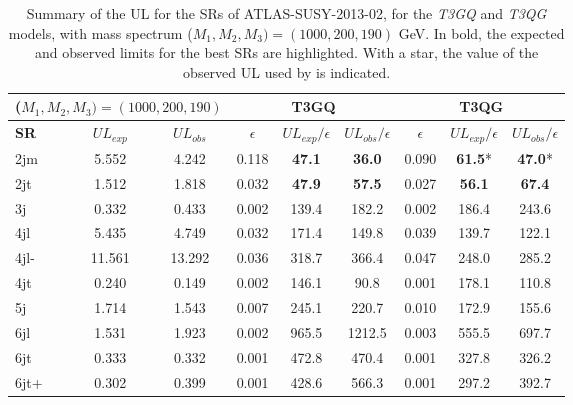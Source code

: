 \documentclass[epj,nopacs,fleqn]{svjour}
\begin{document}
\begin{table}[h]
\centering
\renewcommand\arraystretch{1.3} 
\scriptsize
\begin{tabular}{ l c c    c c c  |  c c c  }
\toprule \toprule
\multicolumn{3}{c}{($M_1,M_2,M_3) = (1000,200,190)$} & \multicolumn{3}{c}{ \textbf{T3GQ}} & \multicolumn{3}{c}{ \textbf{T3QG}} \\  \toprule 
\textbf{SR} & $UL_{exp}$ & $UL_{obs}$ & $\epsilon$ &  $UL_{exp}/\epsilon$ & $UL_{obs}/\epsilon$ & $\epsilon$ & $UL_{exp}/ \epsilon$ & $UL_{obs}/ \epsilon$ \\
2jm & 5.552 &  4.242 &  0.118  & \textbf{47.1} &  \textbf{36.0}  &  0.090 &  \textbf{61.5}*  & \textbf{47.0}*\\
2jt  & 1.512  & 1.818 &  0.032  & \textbf{47.9} &  \textbf{57.5}  &  0.027 &  \textbf{56.1}  & \textbf{67.4} \\
3j &  0.332 &  0.433  & 0.002 &  139.4 &  182.2  &  0.002 &  186.4 &  243.6 \\ 
4jl  & 5.435 &  4.749  & 0.032  & 171.4  & 149.8  &  0.039 &  139.7  & 122.1 \\
4jl-  & 11.561 &  13.292 &  0.036  & 318.7 &  366.4  &  0.047 &  248.0 &  285.2 \\
4jt  & 0.240  & 0.149  & 0.002  & 146.1  & 90.8 &   0.001  & 178.1  & 110.8 \\
5j  & 1.714  & 1.543  & 0.007 &  245.1 &  220.7  &  0.010  & 172.9  & 155.6 \\
6jl  & 1.531  & 1.923  & 0.002  & 965.5 &  1212.5  & 0.003  & 555.5 &  697.7 \\
6jt &  0.333  & 0.332 &  0.001  & 472.8  & 470.4 &  0.001 &  327.8  & 326.2 \\
6jt+  & 0.302 &  0.399 &  0.001  & 428.6  & 566.3  & 0.001  & 297.2  & 392.7 \\
\bottomrule \bottomrule
\end{tabular}
\caption{Summary of the UL for the SRs of ATLAS-SUSY-2013-02, for the \textit{T3GQ} and \textit{T3QG} models, with mass spectrum ($M_1,M_2,M_3) = (1000,200,190)$ GeV. In bold, the expected and observed limits for the best SRs are highlighted. With a star, the value of the observed UL used by \SMO is indicated.}
\label{ATLAS02_UL}
\end{table}
\end{document}
